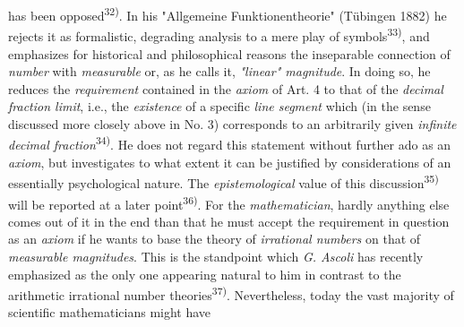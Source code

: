 \thispagestyle{fancy}

\vspace{0.5cm}

has been opposed\textsuperscript{32)}. In his "Allgemeine Funktionentheorie" (Tübingen 1882) he rejects it as formalistic, degrading analysis to a mere play of symbols\textsuperscript{33)}, and emphasizes for historical and philosophical reasons the inseparable connection of \textit{number} with \textit{measurable} or, as he calls it, \textit{"linear" magnitude}. In doing so, he reduces the \textit{requirement} contained in the \textit{axiom} of Art. 4 to that of the \textit{decimal fraction limit}, i.e., the \textit{existence} of a specific \textit{line segment} which (in the sense discussed more closely above in No. 3) corresponds to an arbitrarily given \textit{infinite decimal fraction}\textsuperscript{34)}. He does not regard this statement without further ado as an \textit{axiom}, but investigates to what extent it can be justified by considerations of an essentially psychological nature. The \textit{epistemological} value of this discussion\textsuperscript{35)} will be reported at a later point\textsuperscript{36)}. For the \textit{mathematician}, hardly anything else comes out of it in the end than that he must accept the requirement in question as an \textit{axiom} if he wants to base the theory of \textit{irrational numbers} on that of \textit{measurable magnitudes}. This is the standpoint which \textit{G. Ascoli} has recently emphasized as the only one appearing natural to him in contrast to the arithmetic irrational number theories\textsuperscript{37)}. Nevertheless, today the vast majority of scientific mathematicians might have

